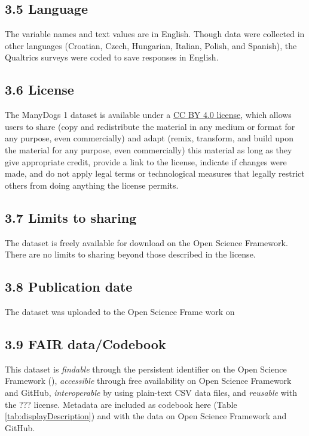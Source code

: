 \documentclass[
  pub,floatsintext]{apa6}
\begin{document}
\hypertarget{language}{%
\subsection{3.5 Language}\label{language}}

The variable names and text values are in English. Though data were collected in other languages (Croatian, Czech, Hungarian, Italian, Polish, and Spanish), the Qualtrics surveys were coded to save responses in English.

\hypertarget{license}{%
\subsection{3.6 License}\label{license}}

The ManyDogs 1 dataset is available under a \href{https://creativecommons.org/licenses/by/4.0/}{CC BY 4.0 license}, which allows users to share (copy and redistribute the material in any medium or format for any purpose, even commercially) and adapt (remix, transform, and build upon the material for any purpose, even commercially) this material as long as they give appropriate credit, provide a link to the license, indicate if changes were made, and do not apply legal terms or technological measures that legally restrict others from doing anything the license permits.

\hypertarget{limits-to-sharing}{%
\subsection{3.7 Limits to sharing}\label{limits-to-sharing}}

The dataset is freely available for download on the Open Science Framework. There are no limits to sharing beyond those described in the license.

\hypertarget{publication-date}{%
\subsection{3.8 Publication date}\label{publication-date}}

The dataset was uploaded to the Open Science Frame work on

\hypertarget{fair-datacodebook}{%
\subsection{3.9 FAIR data/Codebook}\label{fair-datacodebook}}

This dataset is \emph{findable} through the persistent identifier on the Open Science Framework (), \emph{accessible} through free availability on Open Science Framework and GitHub, \emph{interoperable} by using plain-text CSV data files, and \emph{reusable} with the ??? license. Metadata are included as codebook here (Table \ref{tab:displayDescription}) and with the data on Open Science Framework and GitHub.
\end{document}
